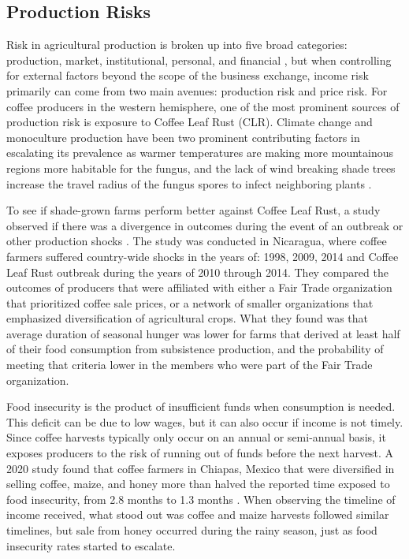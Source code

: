 \documentclass[../main.tex]{subfiles}
\begin{document}
\subsection{Production Risks}

Risk in agricultural production is broken up into five broad categories: production, market, institutional, personal, and financial \parencite{komarek_review_2020}, but when controlling for external factors beyond the scope of the business exchange, income risk primarily can come from two main avenues: production risk and price risk. For coffee producers in the western hemisphere, one of the most prominent sources of production risk is exposure to Coffee Leaf Rust (CLR). Climate change and monoculture production have been two prominent contributing factors in escalating its prevalence as warmer temperatures are making more mountainous regions more habitable for the fungus, and the lack of wind breaking shade trees increase the travel radius of the fungus spores to infect neighboring plants \parencite{avelino_coffee_2015}. 

To see if shade-grown farms perform better against Coffee Leaf Rust, a study observed if there was a divergence in outcomes during the event of an outbreak or other production shocks \parencite{bacon_vulnerability_2017}. The study was conducted in Nicaragua, where coffee farmers suffered country-wide shocks in the years of: 1998, 2009, 2014 and Coffee Leaf Rust outbreak during the years of 2010 through 2014. They compared the outcomes of producers that were affiliated with either a Fair Trade organization that prioritized coffee sale prices, or a network of smaller organizations that emphasized diversification of agricultural crops. What they found was that average duration of seasonal hunger was lower for farms that derived at least half of their food consumption from subsistence production, and the probability of meeting that criteria lower in the members who were part of the Fair Trade organization. 

Food insecurity is the product of insufficient funds when consumption is needed. This deficit can be due to low wages, but it can also occur if income is not timely. Since coffee harvests typically only occur on an annual or semi-annual basis, it exposes producers to the risk of running out of funds before the next harvest. A 2020 study found that coffee farmers in Chiapas, Mexico that were diversified in selling coffee, maize, and honey more than halved the reported time exposed to food insecurity, from 2.8 months to 1.3 months \parencite{anderzen_effects_2020}. When observing the timeline of income received, what stood out was coffee and maize harvests followed similar timelines, but sale from honey occurred during the rainy season, just as food insecurity rates started to escalate.
\end{document}
